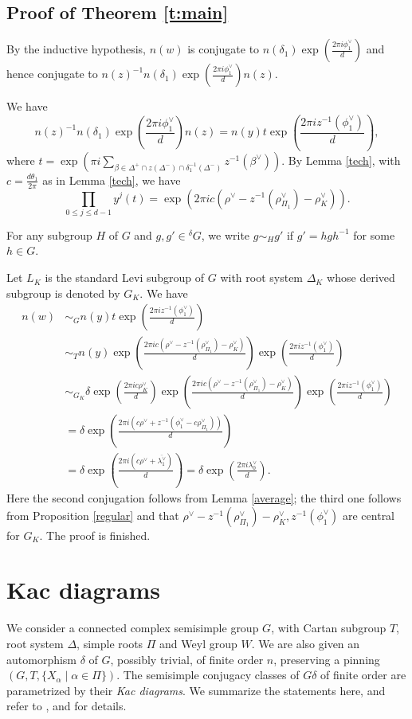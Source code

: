\documentclass[10pt,leqno]{article}
\renewcommand{\sec}[1]{\section{#1}
\renewcommand{\theequation}{\thesection.\arabic{equation}}
  \setcounter{equation}{0}}
\def\le{\leqslant}
\def\b{\beta}
\def\d{\delta}
\def\l{\lambda}
\def\i{^{-1}}
\renewcommand{\sec}[1]{\section{#1}
\renewcommand{\theequation}{\thesection.\arabic{equation}}
  \setcounter{equation}{0}}
\begin{document}
\subsection{Proof of Theorem \ref{t:main}}
By the inductive hypothesis, $n(w)$ is conjugate to $n(\d_1) \exp(\frac{2 \pi i \phi_1^\vee}{d})$ and hence conjugate to $n(z)^{-1} n(\d_1) \exp(\frac{2 \pi i \phi_1^\vee}{d}) n(z)$.

We have $$n(z)^{-1} n(\d_1) \exp(\frac{2 \pi i \phi_1^\vee}{d}) n(z)=n(y) t \exp(\frac{2 \pi i z^{-1}(\phi_1^\vee)}{d}),$$ where
$t=\exp (\pi i\sum_{\b \in \Delta^+ \cap z(\Delta^-) \cap \d_1 \i(\Delta^-)} z^{-1}(\b^\vee))$.
By Lemma \ref{tech}, with $c=\frac{d\theta_1}{2\pi}$ as in Lemma \ref{tech}, we have
$$
\prod_{0 \le j \le d-1} y^j(t)=\exp(2\pi i c (\rho^\vee-z^{-1}(\rho_{\Pi_1}^\vee)-\rho_K^\vee)).
$$

For any subgroup $H$ of $G$ and $g, g' \in {}^\d G$, we write $g \sim_H g'$ if $g'=h g h \i$ for some $h \in G$.

Let $L_K$ is the standard Levi subgroup of $G$ with root system $\Delta_K$ whose derived subgroup is denoted by $G_K$. We have
\begin{align*}
  n(w) &\sim_G  n(y) t \exp(\frac{2 \pi i z^{-1}(\phi_1^\vee)}{d}) \\
       & \sim_T n(y) \exp(\frac{2\pi i c (\rho^\vee-z^{-1}(\rho_{\Pi_1}^\vee)-\rho_K^\vee)}{d}) \exp(\frac{2 \pi i z^{-1}(\phi_1^\vee)}{d}) \\
       & \sim_{G_K} \d \exp(\frac{2 \pi i c \rho_K^\vee}{d}) \exp(\frac{2\pi i c (\rho^\vee-z^{-1}(\rho_{\Pi_1}^\vee)-\rho_K^\vee)}{d}) \exp(\frac{2 \pi i z^{-1}(\phi_1^\vee)}{d}) \\
       &=\d \exp(\frac{2\pi i (c\rho^\vee + z^{-1}(\phi_1^\vee - c\rho_{\Pi_1}^\vee))}{d}) \\
       &=\d \exp(\frac{2\pi i (c\rho^\vee + \overline{\l_1^\vee})}{d})
        =\d \exp(\frac{2 \pi i \l_0^\vee}{d}).
\end{align*}
Here the second conjugation follows from Lemma \ref{average}; the third one follows from Proposition \ref{regular} and that $\rho^\vee-z^{-1}(\rho_{\Pi_1}^\vee)-\rho_K^\vee, z^{-1}(\phi_1^\vee)$ are central for $G_K$. The proof is finished.

\sec{Kac diagrams}
\label{s:kac}

We consider a connected complex semisimple group $G$, with Cartan subgroup $T$, root system $\Delta$,
simple roots $\Pi$ and Weyl group $W$. We are also given
an  automorphism $\delta$ of $G$, possibly trivial, of finite order $n$, preserving a pinning $(G,T,\{X_\alpha\mid \alpha\in\Pi\})$.
The semisimple
conjugacy classes of $G\delta$ of finite order are parametrized by their
{\it Kac diagrams}. We summarize the statements here, and refer to
\cite{ov}, \cite{kac_book} and \cite{reeder_torsion} for details.
\end{document}
